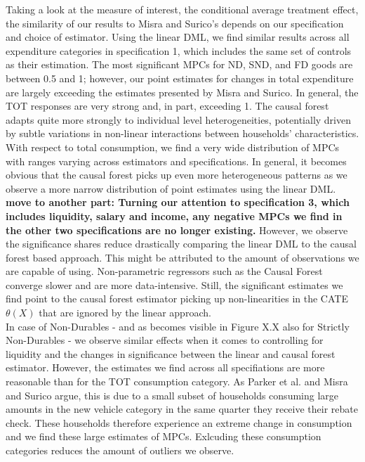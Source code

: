 Taking a look at the measure of interest, the conditional average treatment effect, the similarity of our results to Misra and Surico's depends on our specification and choice of estimator. Using the linear DML, we find similar results across all expenditure categories in specification 1, which includes the same set of controls as their estimation. The most significant MPCs for ND, SND, and FD goods are between 0.5 and 1; however, our point estimates for changes in total expenditure are largely exceeding the estimates presented by Misra and Surico. In general, the TOT responses are very strong and, in part, exceeding 1. The causal forest adapts quite more strongly to individual level heterogeneities, potentially driven by subtle variations in non-linear interactions between households’ characteristics. \\
With respect to total consumption, we find a very wide distribution of MPCs with ranges varying across estimators and specifications. In general, it becomes obvious that the causal forest picks up even more heterogeneous patterns as we observe a more narrow distribution of point estimates using the linear DML. \textbf{move to another part: Turning our attention to specification 3, which includes liquidity, salary and income, any negative MPCs we find in the other two specifications are no longer existing.} However, we observe the significance shares reduce drastically comparing the linear DML to the causal forest based approach. This might be attributed to the amount of observations we are capable of using. Non-parametric regressors such as the Causal Forest converge slower and are more data-intensive. Still, the significant estimates we find point to the causal forest estimator picking up non-linearities in the CATE $\theta(X)$ that are ignored by the linear approach. \\
In case of Non-Durables - and as becomes visible in Figure X.X also for Strictly Non-Durables - we observe similar effects when it comes to controlling for liquidity and the changes in significance between the linear and causal forest estimator. However, the estimates we find across all specifiations are more reasonable than for the TOT consumption category. As Parker et al. and Misra and Surico argue, this is due to a small subset of households consuming large amounts in the new vehicle category in the same quarter they receive their rebate check. These households therefore experience an extreme change in consumption and we find these large estimates of MPCs. Exlcuding these consumption categories reduces the amount of outliers we observe. \\
